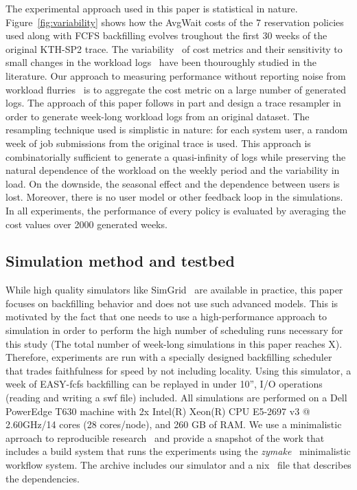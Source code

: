 The experimental approach used in this paper is statistical in nature.
Figure~\ref{fig:variability} shows how the AvgWait costs of the 7 reservation
policies used along with FCFS backfilling evolves troughout the first 30 weeks
of the original KTH-SP2 trace. The
variability~\cite{variability,frachtenberg2005pitfalls} of cost metrics and
their sensitivity to small changes in the workload logs~\cite{flurries} have been
thouroughly studied in the literature. Our approach to measuring performance
without reporting noise from workload flurries~\cite{flurries} is to aggregate
the cost metric on a large number of generated logs. The approach of this
paper follows in part \cite{feitresampling} and design a trace resampler in
order to generate week-long workload logs from an original dataset. The
resampling technique used is simplistic in nature: for each system user, a
random week of job submissions from the original trace is used.  This approach
is combinatorially sufficient to generate a quasi-infinity of logs while
preserving the natural dependence of the workload on the weekly period and the
variability in load. On the downside, the seasonal effect and the dependence
between users is lost.  Moreover, there is no user model or other feedback loop
in the simulations. In all experiments, the performance of every policy is
evaluated by averaging the cost values over 2000 generated weeks.

\subsection{Simulation method and testbed}

While high quality simulators like SimGrid~\cite{casanova:hal-01017319} are
available in practice, this paper focuses on backfilling behavior and does not
use such advanced models. This is motivated by the fact that one needs to use a
high-performance approach to simulation in order to perform the high number of
scheduling runs necessary for this study (The total number of week-long
simulations in this paper reaches X). Therefore, experiments are run with a
specially designed backfilling scheduler that trades faithfulness for speed by
not including locality. Using this simulator, a week of EASY-fcfs backfilling
can be replayed in under 10'', I/O operations (reading and writing a swf file)
included. All simulations are performed on a Dell PowerEdge T630 machine with
2x Intel(R) Xeon(R) CPU E5-2697 v3 @ 2.60GHz/14 cores (28 cores/node), and 260
GB of RAM. We use a minimalistic aprroach to reproducible
research~\cite{stodden2014implementing} and provide a snapshot of the work that
includes a build system that runs the experiments using the
\textit{zymake}~\cite{breck2008zymake} minimalistic workflow system.  The
archive includes our simulator and a nix~\cite{dolstra2004imposing} file that
describes the dependencies.

